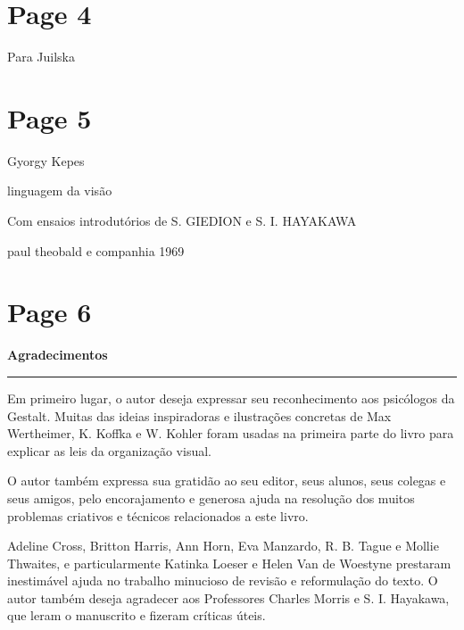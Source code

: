 \documentclass[a4paper]{article}
\begin{document}

\newpage
\section*{Page 4}

\vspace*{2in}
Para Juilska

\newpage
\section*{Page 5}

Gyorgy Kepes

linguagem da visão

Com ensaios introdutórios de S. GIEDION e S. I. HAYAKAWA

paul theobald e companhia 1969

\newpage
\section*{Page 6}

\begin{center}
\normalfont\large\bfseries Agradecimentos
\vspace{0.5em}
\rule{1.5in}{0.4pt}
\vspace{1em}
\end{center}

\raggedright
Em primeiro lugar, o autor deseja expressar seu reconhecimento aos psicólogos da Gestalt. Muitas das ideias inspiradoras e ilustrações concretas de Max Wertheimer, K. Koffka e W. Kohler foram usadas na primeira parte do livro para explicar as leis da organização visual.

O autor também expressa sua gratidão ao seu editor, seus alunos, seus colegas e seus amigos, pelo encorajamento e generosa ajuda na resolução dos muitos problemas criativos e técnicos relacionados a este livro.

Adeline Cross, Britton Harris, Ann Horn, Eva Manzardo, R. B. Tague e Mollie Thwaites, e particularmente Katinka Loeser e Helen Van de Woestyne prestaram inestimável ajuda no trabalho minucioso de revisão e reformulação do texto. O autor também deseja agradecer aos Professores Charles Morris e S. I. Hayakawa, que leram o manuscrito e fizeram críticas úteis.
\end{document}

